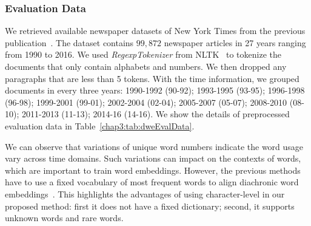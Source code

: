 \subsubsection{Evaluation Data}
We retrieved available newspaper datasets of New York Times from the previous publication~\cite{yao2018dynamic}.
The dataset contains $99,872$ newspaper articles in 27 years ranging from 1990 to 2016.
We used \textit{RegexpTokenizer} from NLTK~\cite{bird2004nltk} to tokenize the documents that only contain alphabets and numbers.
We then dropped any paragraphs that are less than 5 tokens.
With the time information, we grouped documents in every three years: 1990-1992 (90-92); 1993-1995 (93-95); 1996-1998 (96-98); 1999-2001 (99-01); 2002-2004 (02-04); 2005-2007 (05-07); 2008-2010 (08-10); 2011-2013 (11-13); 2014-16 (14-16). 
We show the details of preprocessed evaluation data in Table~\ref{chap3:tab:dweEvalData}.


\begin{table}[htp]
\centering
{}
\caption{Data stats across each temporal and the general domain, where $\#doc$ is the number of documents, $\#uw$ refers to the unique numbers of words in the domain and $\#awpd$ means the average number of words per document. We filtered out the words if their frequency are smaller than 5 in the general domain.}
\label{chap3:tab:dweEvalData}
\end{table}

We can observe that variations of unique word numbers indicate the word usage vary across time domains. 
Such variations can impact on the contexts of words, which are important to train word embeddings.
However, the previous methods have to use a fixed vocabulary of most frequent words to align diachronic word embeddings~\cite{kulkarni2015statistically, hamilton2016diachronic}.
This highlights the advantages of using character-level in our proposed method: first it does not have a fixed dictionary; second, it supports unknown words and rare words.

